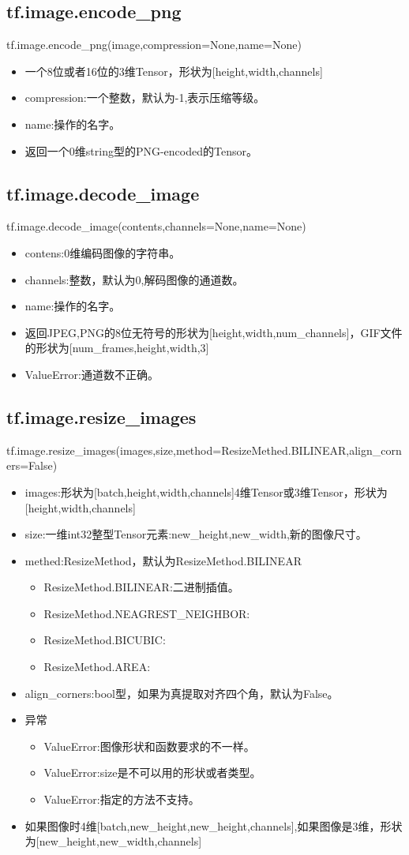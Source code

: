 \subsection{tf.image.encode\_png}
tf.image.encode\_png(image,compression=None,name=None)
\begin{itemize}
	\item 一个8位或者16位的3维Tensor，形状为[height,width,channels]
	\item compression:一个整数，默认为-1,表示压缩等级。
	\item name:操作的名字。
	\item 返回一个0维string型的PNG-encoded的Tensor。
\end{itemize}
\subsection{tf.image.decode\_image}
tf.image.decode\_image(contents,channels=None,name=None)
\begin{itemize}
	\item contens:0维编码图像的字符串。
	\item channels:整数，默认为0,解码图像的通道数。
	\item name:操作的名字。
	\item 返回JPEG,PNG的8位无符号的形状为[height,width,num\_channels]，GIF文件的形状为[num\_frames,height,width,3]
	\item ValueError:通道数不正确。
\end{itemize}
\subsection{tf.image.resize\_images}
tf.image.resize\_images(images,size,method=ResizeMethed.BILINEAR,align\_corners=False)
\begin{itemize}
	\item images:形状为[batch,height,width,channels]4维Tensor或3维Tensor，形状为[height,width,channels]
	\item size:一维int32整型Tensor元素:new\_height,new\_width,新的图像尺寸。
	\item methed:ResizeMethod，默认为ResizeMethod.BILINEAR
		\begin{itemize}
			\item ResizeMethod.BILINEAR:二进制插值。
			\item ResizeMethod.NEAGREST\_NEIGHBOR:
			\item ResizeMethod.BICUBIC:
			\item ResizeMethod.AREA:
		\end{itemize}
	\item align\_corners:bool型，如果为真提取对齐四个角，默认为False。
	\item 异常
		\begin{itemize}
			\item ValueError:图像形状和函数要求的不一样。
			\item ValueError:size是不可以用的形状或者类型。
			\item ValueError:指定的方法不支持。
		\end{itemize}
	\item 如果图像时4维[batch,new\_height,new\_height,channels],如果图像是3维，形状为[new\_height,new\_width,channels]
\end{itemize}

